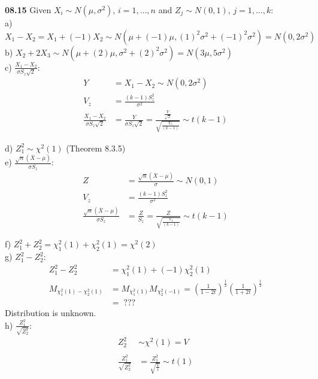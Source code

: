 
{ \bf 08.15 } Given $X_i \sim N(\mu, \sigma^2)$, $i=1,\dots, n$ and $Z_j \sim N(0, 1)$, $j=1,\dots, k$:\\

a) $X_1 - X_2 = X_1 + (-1)X_2 \sim N\left(\mu + (-1)\mu, (1)^2\sigma^2 + (-1)^2\sigma^2\right) = N(0, 2\sigma^2)$ \\

b) $X_2 + 2X_3 \sim N\left(\mu + (2)\mu, \sigma^2 + (2)^2\sigma^2\right) = N(3\mu, 5\sigma^2)$\\

c) $\frac{X_1 - X_2}{\sigma S_z \sqrt{2}}$:
\begin{align*}
Y &= X_1 - X_2 \sim N(0, 2\sigma^2) \\
V_z &= \frac{(k-1)S^2_z}{\sigma^2} \\
\frac{X_1 - X_2}{\sigma S_z \sqrt{2}} &= \frac{Y}{\sigma S_z \sqrt{2}} = \frac{\frac{Y}{\sqrt{2}}}{\sqrt{\frac{V_z}{(k-1)}}} \sim t(k-1)
\end{align*}

d) $Z^2_1 \sim \chi^2(1)$ (Theorem 8.3.5) \\

e) $\frac{\sqrt{n} (\overline{X} - \mu)}{\sigma S_z}$:
\begin{align*}
Z &= \frac{\sqrt{n} (\overline{X} - \mu)}{\sigma} \sim N(0, 1) \\
V_z &= \frac{(k-1)S^2_z}{\sigma^2} \\
\frac{\sqrt{n} (\overline{X} - \mu)}{\sigma S_z} &= \frac{Z}{S_z} = \frac{Z}{\sqrt{\frac{V_z}{(k-1)}}} \sim t(k-1)
\end{align*}

f) $Z^2_1 + Z^2_2 = \chi^2_1(1) + \chi^2_2(1) = \chi^2(2)$ \\

g) $Z^2_1 - Z^2_2$:
\begin{align*}
Z^2_1 - Z^2_2 &= \chi^2_1(1) + (-1) \chi^2_2(1) \\
M_{\chi^2_1(1) - \chi^2_2(1)} &= M_{\chi^2_1(1)} M_{\chi^2_2(-1)} 
  = \left(\frac{1}{1-2t}\right)^{\frac{1}{2}} \left(\frac{1}{1+2t}\right)^{\frac{1}{2}} \\
  &=\; ???
\end{align*}
Distribution is unknown.\\

h) $\frac{Z^2_1}{\sqrt{Z^2_2}}$:
\begin{align*}
Z^2_2 &\sim \chi^2(1) = V \\ \\
\frac{Z^2_1}{\sqrt{Z^2_2}} &= \frac{Z^2_1}{\sqrt{\frac{V}{1}}} \sim t(1)
\end{align*}

